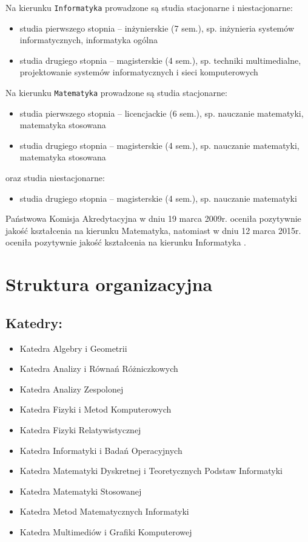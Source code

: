 ﻿\documentclass[a4paper,12pt]{article}
\begin{document}
Na kierunku \verb+Informatyka+ prowadzone są studia stacjonarne i niestacjonarne:
\begin{itemize}
	\item studia pierwszego stopnia – inżynierskie (7 sem.), sp. inżynieria systemów informatycznych, informatyka
ogólna
	\item studia drugiego stopnia – magisterskie (4 sem.), sp. techniki multimedialne, projektowanie systemów
informatycznych i sieci komputerowych
\end{itemize}
Na kierunku \verb+Matematyka+ prowadzone są studia stacjonarne:
\begin{itemize}
	\item studia pierwszego stopnia – licencjackie (6 sem.), sp. nauczanie matematyki, matematyka stosowana
	\item studia drugiego stopnia – magisterskie (4 sem.), sp. nauczanie matematyki, matematyka stosowana
\end{itemize}
oraz studia niestacjonarne:
\begin{itemize}
	\item studia drugiego stopnia – magisterskie (4 sem.), sp. nauczanie matematyki
\end{itemize}
Państwowa Komisja Akredytacyjna w dniu 19 marca 2009r. oceniła pozytywnie jakość kształcenia na kierunku Matematyka, natomiast w dniu 12 marca 2015r. oceniła pozytywnie jakość kształcenia na kierunku Informatyka \cite{b2}.

\section{Struktura organizacyjna}
\subsection{Katedry:}
\begin{itemize}
	\item Katedra Algebry i Geometrii
	\item Katedra Analizy i Równań Różniczkowych
	\item Katedra Analizy Zespolonej
	\item Katedra Fizyki i Metod Komputerowych
	\item Katedra Fizyki Relatywistycznej
	\item Katedra Informatyki i Badań Operacyjnych
	\item Katedra Matematyki Dyskretnej i Teoretycznych Podstaw Informatyki
	\item Katedra Matematyki Stosowanej
	\item Katedra Metod Matematycznych Informatyki
	\item Katedra Multimediów i Grafiki Komputerowej
\end{itemize}
\end{document}
